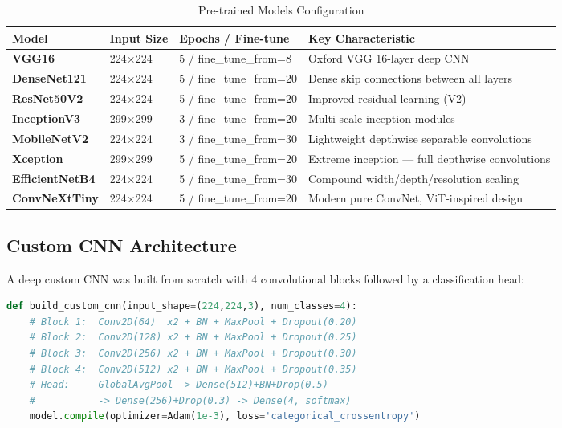 \documentclass[12pt,a4paper]{article}
\begin{document}
\begin{table}[H]
\centering
\caption{Pre-trained Models Configuration}
\label{tab:pretrained_models_desc}
\begin{tabularx}{\textwidth}{>{\bfseries}l l l X}
  \toprule
  Model          & Input Size         & Epochs / Fine-tune      & Key Characteristic \\
  \midrule
  VGG16          & 224$\times$224     & 5 / fine\_tune\_from=8  & Oxford VGG 16-layer deep CNN \\
  DenseNet121    & 224$\times$224     & 5 / fine\_tune\_from=20 & Dense skip connections between all layers \\
  ResNet50V2     & 224$\times$224     & 5 / fine\_tune\_from=20 & Improved residual learning (V2) \\
  InceptionV3    & 299$\times$299     & 3 / fine\_tune\_from=20 & Multi-scale inception modules \\
  MobileNetV2    & 224$\times$224     & 3 / fine\_tune\_from=30 & Lightweight depthwise separable convolutions \\
  Xception       & 299$\times$299     & 5 / fine\_tune\_from=20 & Extreme inception --- full depthwise convolutions \\
  EfficientNetB4 & 224$\times$224     & 5 / fine\_tune\_from=30 & Compound width/depth/resolution scaling \\
  ConvNeXtTiny   & 224$\times$224     & 5 / fine\_tune\_from=20 & Modern pure ConvNet, ViT-inspired design \\
  \bottomrule
\end{tabularx}
\end{table}

\subsection{Custom CNN Architecture}

A deep custom CNN was built from scratch with 4 convolutional blocks followed by a classification head:

\begin{lstlisting}[language=Python, caption={Custom CNN Architecture}]
def build_custom_cnn(input_shape=(224,224,3), num_classes=4):
    # Block 1:  Conv2D(64)  x2 + BN + MaxPool + Dropout(0.20)
    # Block 2:  Conv2D(128) x2 + BN + MaxPool + Dropout(0.25)
    # Block 3:  Conv2D(256) x2 + BN + MaxPool + Dropout(0.30)
    # Block 4:  Conv2D(512) x2 + BN + MaxPool + Dropout(0.35)
    # Head:     GlobalAvgPool -> Dense(512)+BN+Drop(0.5)
    #           -> Dense(256)+Drop(0.3) -> Dense(4, softmax)
    model.compile(optimizer=Adam(1e-3), loss='categorical_crossentropy')
\end{lstlisting}
\end{document}

